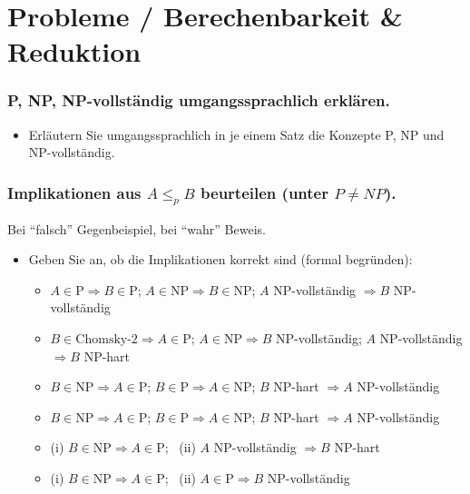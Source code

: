 \section{Probleme / Berechenbarkeit \& Reduktion}\label{subsec:probleme-/-berechenbarkeit-&-reduktion}

\subsubsection{P, NP, NP-vollständig umgangssprachlich erklären.}
\begin{itemize}
    \item Erläutern Sie umgangssprachlich in je einem Satz die Konzepte P, NP und NP-vollständig.  \quad {}
\end{itemize}

\subsubsection{Implikationen aus $A\le_p B$ beurteilen (unter $P\ne NP$).}
Bei ``falsch'' Gegenbeispiel, bei ``wahr'' Beweis.
\begin{itemize}
    \item Geben Sie an, ob die Implikationen korrekt sind (formal begründen):
    \begin{itemize}
        \item $A\in\mathrm{P}\Rightarrow B\in\mathrm{P}$; \; $A\in\mathrm{NP}\Rightarrow B\in\mathrm{NP}$; \; $A$
        NP-vollständig $\Rightarrow B$ NP-vollständig 
        \item $B\in\text{Chomsky-2}\Rightarrow A\in\mathrm{P}$; \; $A\in\mathrm{NP}\Rightarrow B$ NP-vollständig; \; $A$ NP-vollständig $\Rightarrow B$ NP-hart  
        \item  $B\in\mathrm{NP}\Rightarrow A\in\mathrm{P}$; \; $B\in\mathrm{P}\Rightarrow A\in\mathrm{NP}$; \; $B$
        NP-hart $\Rightarrow A$ NP-vollständig 
        \item $B\in\mathrm{NP}\Rightarrow A\in\mathrm{P}$; \; $B\in\mathrm{P}\Rightarrow A\in\mathrm{NP}$; \; $B$
        NP-hart $\Rightarrow A$ NP-vollständig 
        \item (i) $B\in\mathrm{NP}\Rightarrow A\in\mathrm{P}$; \ (ii) $A$ NP-vollständig $\Rightarrow B$ NP-hart  
        \item (i) $B\in\mathrm{NP}\Rightarrow A\in\mathrm{P}$; \ (ii) $A\in\mathrm{P}\Rightarrow B$ NP-vollständig 
    \end{itemize}
\end{itemize}

